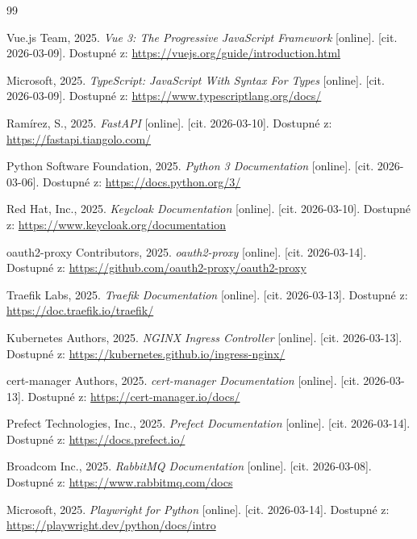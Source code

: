 \documentclass[a4paper, 11pt]{article}
\newcommand{\docurl}[1]{\textcolor{cblue}{\url{#1}}}
\begin{document}
\newpage
\renewcommand{\refname}{Zdroje}
\begin{thebibliography}{99}

 Vue.js Team, 2025. \textit{Vue 3: The Progressive JavaScript Framework} [online]. [cit. 2026-03-09]. Dostupné z: \docurl{https://vuejs.org/guide/introduction.html}

 Microsoft, 2025. \textit{TypeScript: JavaScript With Syntax For Types} [online]. [cit. 2026-03-09]. Dostupné z: \docurl{https://www.typescriptlang.org/docs/}

 Ramírez, S., 2025. \textit{FastAPI} [online]. [cit. 2026-03-10]. Dostupné z: \docurl{https://fastapi.tiangolo.com/}

 Python Software Foundation, 2025. \textit{Python 3 Documentation} [online]. [cit. 2026-03-06]. Dostupné z: \docurl{https://docs.python.org/3/}

 Red Hat, Inc., 2025. \textit{Keycloak Documentation} [online]. [cit. 2026-03-10]. Dostupné z: \docurl{https://www.keycloak.org/documentation}

 oauth2-proxy Contributors, 2025. \textit{oauth2-proxy} [online]. [cit. 2026-03-14]. Dostupné z: \docurl{https://github.com/oauth2-proxy/oauth2-proxy}

 Traefik Labs, 2025. \textit{Traefik Documentation} [online]. [cit. 2026-03-13]. Dostupné z: \docurl{https://doc.traefik.io/traefik/}

 Kubernetes Authors, 2025. \textit{NGINX Ingress Controller} [online]. [cit. 2026-03-13]. Dostupné z: \docurl{https://kubernetes.github.io/ingress-nginx/}

 cert-manager Authors, 2025. \textit{cert-manager Documentation} [online]. [cit. 2026-03-13]. Dostupné z: \docurl{https://cert-manager.io/docs/}

 Prefect Technologies, Inc., 2025. \textit{Prefect Documentation} [online]. [cit. 2026-03-14]. Dostupné z: \docurl{https://docs.prefect.io/}

 Broadcom Inc., 2025. \textit{RabbitMQ Documentation} [online]. [cit. 2026-03-08]. Dostupné z: \docurl{https://www.rabbitmq.com/docs}

 Microsoft, 2025. \textit{Playwright for Python} [online]. [cit. 2026-03-14]. Dostupné z: \docurl{https://playwright.dev/python/docs/intro}


\end{thebibliography}
\end{document}
